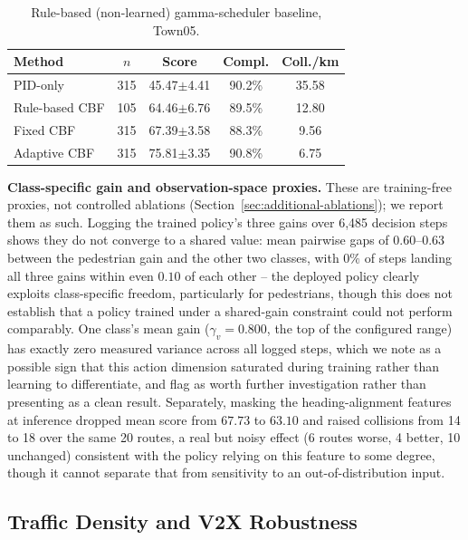\begin{table}[!htbp]
\centering
\caption{Rule-based (non-learned) gamma-scheduler baseline, Town05.}
\label{tab:rule-based}
{\scriptsize
\setlength{\tabcolsep}{4pt}
\begin{tabular}{lcccc}
\toprule
Method & $n$ & Score & Compl. & Coll./km \\
\midrule
PID-only        & 315 & 45.47$\pm$4.41 & 90.2\% & 35.58 \\
Rule-based CBF  & 105 & 64.46$\pm$6.76 & 89.5\% & 12.80 \\
Fixed CBF       & 315 & 67.39$\pm$3.58 & 88.3\% & 9.56 \\
Adaptive CBF    & 315 & 75.81$\pm$3.35 & 90.8\% & 6.75 \\
\bottomrule
\end{tabular} }
\end{table}

\textbf{Class-specific gain and observation-space proxies.} These are training-free proxies, not controlled ablations (Section~\ref{sec:additional-ablations}); we report them as such. Logging the trained policy's three gains over 6{,}485 decision steps shows they do not converge to a shared value: mean pairwise gaps of $0.60$--$0.63$ between the pedestrian gain and the other two classes, with $0\%$ of steps landing all three gains within even $0.10$ of each other -- the deployed policy clearly exploits class-specific freedom, particularly for pedestrians, though this does not establish that a policy trained under a shared-gain constraint could not perform comparably. One class's mean gain ($\gamma_v{=}0.800$, the top of the configured range) has exactly zero measured variance across all logged steps, which we note as a possible sign that this action dimension saturated during training rather than learning to differentiate, and flag as worth further investigation rather than presenting as a clean result. Separately, masking the heading-alignment features at inference dropped mean score from $67.73$ to $63.10$ and raised collisions from 14 to 18 over the same 20 routes, a real but noisy effect (6 routes worse, 4 better, 10 unchanged) consistent with the policy relying on this feature to some degree, though it cannot separate that from sensitivity to an out-of-distribution input.

\subsection{Traffic Density and V2X Robustness}
\label{sec:robustness}

